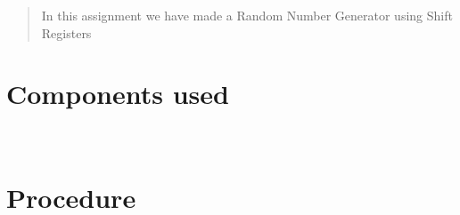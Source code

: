 \documentclass[journal,12pt,twocolumn]{IEEEtran}
\theoremstyle{remark}
\begin{document}
			\begin{abstract}
				In this assignment we have made a Random Number Generator using Shift Registers
			\end{abstract}

			\section*{\large\textbf{Components used}}
			\\
			\begin{table}[htbp]
				\label{tab:Hardware_Assignment}
				
			\end{table}

			\section*{\large Procedure}
			\\
\end{document}
